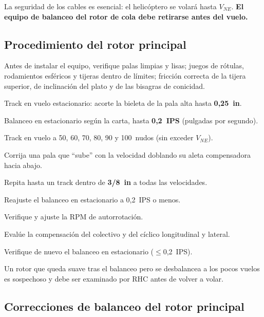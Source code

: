 \begin{precaucion}
La seguridad de los cables es esencial: el helicóptero se volará hasta $V_{NE}$. \textbf{El equipo de balanceo del rotor de cola debe retirarse antes del vuelo.}
\end{precaucion}

\subsection{Procedimiento del rotor principal}

Antes de instalar el equipo, verifique palas limpias y lisas; juegos de rótulas, rodamientos esféricos y tijeras dentro de límites; fricción correcta de la tijera superior, de inclinación del plato y de las bisagras de conicidad.

\begin{pasos}
\item Track en vuelo estacionario: acorte la bieleta de la pala alta hasta \textbf{0,25~in}.
\item Balanceo en estacionario según la carta, hasta \textbf{0,2~IPS} (pulgadas por segundo).
\item Track en vuelo a 50, 60, 70, 80, 90 y 100~nudos (sin exceder $V_{NE}$).
\item Corrija una pala que ``sube'' con la velocidad doblando su aleta compensadora hacia abajo.
\item Repita hasta un track dentro de \textbf{3/8~in} a todas las velocidades.
\item Reajuste el balanceo en estacionario a 0,2~IPS o menos.
\item Verifique y ajuste la RPM de autorrotación.
\item Evalúe la compensación del colectivo y del cíclico longitudinal y lateral.
\item Verifique de nuevo el balanceo en estacionario ($\le$0,2~IPS).
\end{pasos}

\begin{advertencia}
Un rotor que queda suave tras el balanceo pero se desbalancea a los pocos vuelos es sospechoso y debe ser examinado por RHC antes de volver a volar.
\end{advertencia}

\subsection{Correcciones de balanceo del rotor principal}

